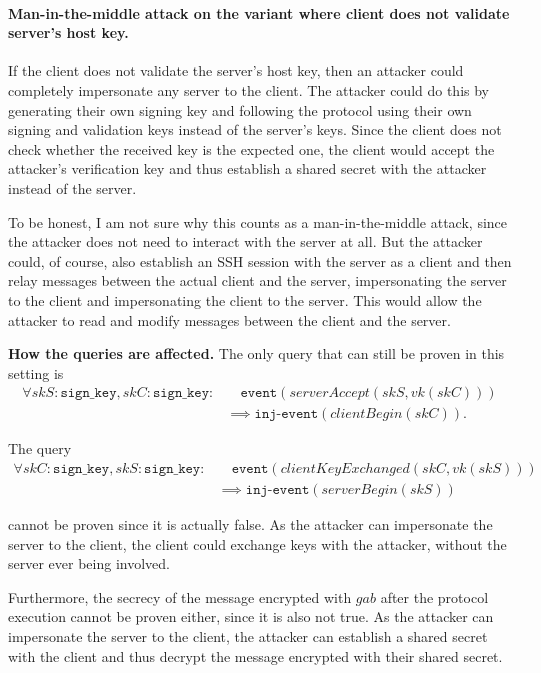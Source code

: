 \documentclass[12pt,a4paper]{article}
\begin{document}
\paragraph{Man-in-the-middle attack on the variant where client does not validate server's host key.}
If the client does not validate the server's host key, then an attacker could completely impersonate any 
server to the client. The attacker could do this by generating their own signing key and following the 
protocol using their own signing and validation keys instead of the server's keys. Since the client does 
not check whether the received key is the expected one, the client would accept the attacker's verification 
key and thus establish a shared secret with the attacker instead of the server.

To be honest, I am not sure why this counts as a man-in-the-middle attack, since the attacker does not need 
to interact with the server at all. But the attacker could, of course, also establish an SSH session with the server as 
a client and then relay messages between the actual client and the server, impersonating the server to the 
client and impersonating the client to the server. This would allow the attacker to read and modify messages 
between the client and the server.

\textbf{How the queries are affected.}  
The only query that can still be proven in this setting is
\begin{align*}
    \forall skS: \texttt{sign\_key}, skC: \texttt{sign\_key}: &\quad \texttt{event}(serverAccept(skS, vk(skC))) \\
    &\implies \texttt{inj-event}(clientBegin(skC)).
\end{align*}

The query 
\begin{align*}
    \forall skC: \texttt{sign\_key}, skS: \texttt{sign\_key}: &\quad \texttt{event}(clientKeyExchanged(skC, vk(skS))) \\
    &\implies \texttt{inj-event}(serverBegin(skS))
\end{align*}

cannot be proven since it is actually false. As the attacker can impersonate the server to the client, the client could 
exchange keys with the attacker, without the server ever being involved.

Furthermore, the secrecy of the message encrypted with $gab$ after the protocol execution cannot be proven either, since 
it is also not true. As the attacker can impersonate the server to the client, the attacker can establish a shared secret 
with the client and thus decrypt the message encrypted with their shared secret.
\end{document}
